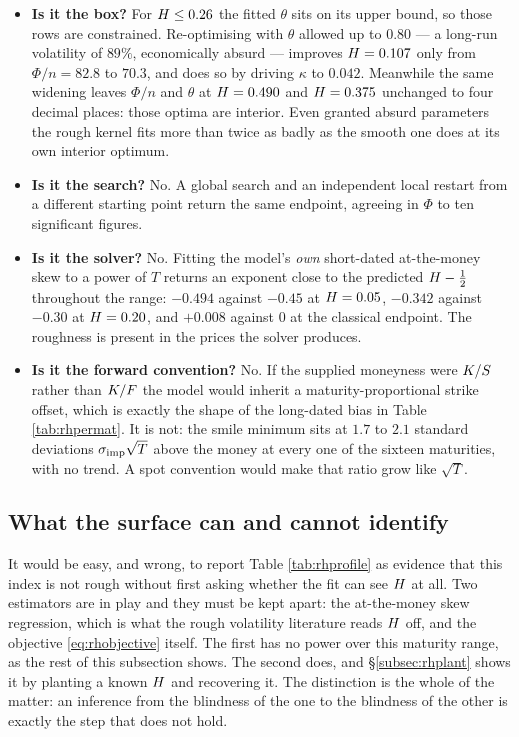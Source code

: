 \begin{itemize}
  \item \textbf{Is it the box?} For $H\le0.26$ the fitted $\theta$ sits on its upper bound, so
    those rows are constrained. Re-optimising with $\theta$ allowed up to $0.80$ --- a long-run
    volatility of $89\%$, economically absurd --- improves $H=0.107$ only from $\Phi/n=82.8$ to
    $70.3$, and does so by driving $\kappa$ to $0.042$. Meanwhile the same widening leaves $\Phi/n$
    and $\theta$ at $H=0.490$ and $H=0.375$ unchanged to four decimal places: those
    optima are interior. Even granted absurd parameters the rough kernel fits more than twice as badly
    as the smooth one does at its own interior optimum.
  \item \textbf{Is it the search?} No. A global search and an independent local restart from a
    different starting point return the same endpoint, agreeing in $\Phi$ to ten significant
    figures.
  \item \textbf{Is it the solver?} No. Fitting the model's \emph{own} short-dated at-the-money skew
    to a power of $T$ returns an exponent close to the predicted $H-\tfrac12$ throughout the
    range: $-0.494$ against $-0.45$ at $H=0.05$, $-0.342$ against $-0.30$ at $H=0.20$,
    and $+0.008$ against $0$ at the classical endpoint. The roughness is present in the prices the
    solver produces.
  \item \textbf{Is it the forward convention?} No. If the supplied moneyness were $K/S$
    rather than $K/F$ the model would inherit a maturity-proportional strike offset, which is
    exactly the shape of the long-dated bias in Table \ref{tab:rhpermat}. It is not: the smile minimum
    sits at $1.7$ to $2.1$ standard deviations $\sigma_{\mathrm{imp}}\sqrt{T}$ above the money at every one of the
    sixteen maturities, with no trend. A spot convention would make that ratio grow like $\sqrt{T}$.
\end{itemize}

\subsection{What the surface can and cannot identify}
\label{subsec:rhidentification}

It would be easy, and wrong, to report Table \ref{tab:rhprofile} as evidence that this index is not
rough without first asking whether the fit can see $H$ at all. Two estimators are in play and
they must be kept apart: the at-the-money skew regression, which is what the rough volatility
literature reads $H$ off, and the objective \eqref{eq:rhobjective} itself. The first has no
power over this maturity range, as the rest of this subsection shows. The second does, and
\S\ref{subsec:rhplant} shows it by planting a known $H$ and recovering it. The distinction is
the whole of the matter: an inference from the blindness of the one to the blindness of the other is
exactly the step that does not hold.


